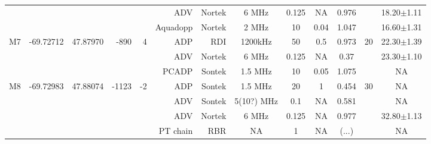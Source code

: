 \begin{sidewaystable}
\begin{tabular}{|r|c|c|r|r|r|r|c|c|c|c|c|c|}
    ~                   &                            &                           &                        &                       & ADV          & Nortek     & 6 MHz     & 0.125     & NA       & 0.976      &                    &  18.20$\pm$1.11   \\ %
    ~                   &                            &                           &                        &                       & Aquadopp     & Nortek     & 2 MHz     & 10        & 0.04     & 1.047      &                    &  16.60$\pm$1.31   \\\hline
    \multirow{3}{*}{M7} & \multirow{3}{*}{-69.72712} & \multirow{3}{*}{47.87970} & \multirow{3}{*}{-890}  & \multirow{3}{*}{4}    & ADP          & RDI        & 1200kHz   & 50        & 0.5      & 0.973      & \multirow{3}{*}{20}&  22.30$\pm$1.39   \\ 
    ~                   &                            &                           &                        &                       & ADV          & Nortek     & 6 MHz     & 0.125     & NA       & 0.37       &                    &  23.30$\pm$1.10   \\ %
    ~                   &                            &                           &                        &                       & PCADP        & Sontek     & 1.5 MHz   & 10        & 0.05     & 1.075      &                    &  NA               \\\hline
    \multirow{4}{*}{M8} & \multirow{4}{*}{-69.72983} & \multirow{4}{*}{47.88074} & \multirow{4}{*}{-1123} & \multirow{4}{*}{-2}   & ADP          & Sontek     & 1.5 MHz   & 20        & 1        & 0.454      & \multirow{4}{*}{30}&  NA               \\ 
    ~                   &                            &                           &                        &                       & ADV          & Sontek     & 5(10?) MHz& 0.1       & NA       & 0.581      &                    &  NA               \\ 
    ~                   &                            &                           &                        &                       & ADV          & Nortek     & 6 MHz     & 0.125     & NA       & 0.977      &                    &  32.80$\pm$1.13   \\ %
    ~                   &                            &                           &                        &                       & PT chain     & RBR        & NA        & 1         & NA       & (...)      &                    &  NA               \\\hline

\end{tabular}
\end{sidewaystable}
